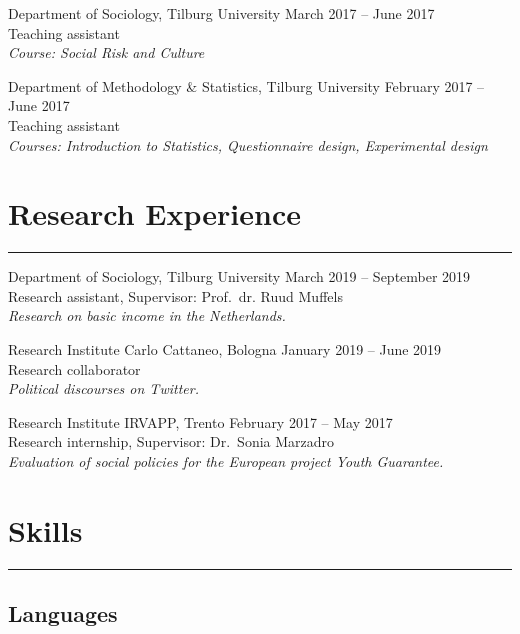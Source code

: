 \documentclass[12pt,]{article}
\begin{document}
Department of Sociology, Tilburg University
\hfill \begingroup\small March 2017 -- June 2017\endgroup\\
Teaching assistant\\
\emph{Course: Social Risk and Culture}

Department of Methodology \& Statistics, Tilburg University
\hfill \begingroup\small February 2017 -- June 2017\endgroup\\
Teaching assistant\\
\emph{Courses: Introduction to Statistics, Questionnaire design,
Experimental design}

\hypertarget{research-experience}{%
\section{Research Experience}\label{research-experience}}

\vspace{-10pt}
\rule{1\linewidth}{\linethickness}

Department of Sociology, Tilburg University
\hfill \begingroup\small March 2019 -- September 2019\endgroup\\
Research assistant, Supervisor: Prof.~dr. Ruud Muffels\\
\emph{Research on basic income in the Netherlands.}

Research Institute Carlo Cattaneo, Bologna
\hfill \begingroup\small January 2019 -- June 2019\endgroup\\
Research collaborator\\
\emph{Political discourses on Twitter.}

Research Institute IRVAPP, Trento \hfill \begingroup\small February 2017
-- May 2017\endgroup\\
Research internship, Supervisor: Dr.~Sonia Marzadro\\
\emph{Evaluation of social policies for the European project Youth
Guarantee.}

\hypertarget{skills}{%
\section{Skills}\label{skills}}

\vspace{-10pt}
\rule{1\linewidth}{\linethickness}

\hypertarget{languages}{%
\subsection{Languages}\label{languages}}
\end{document}
